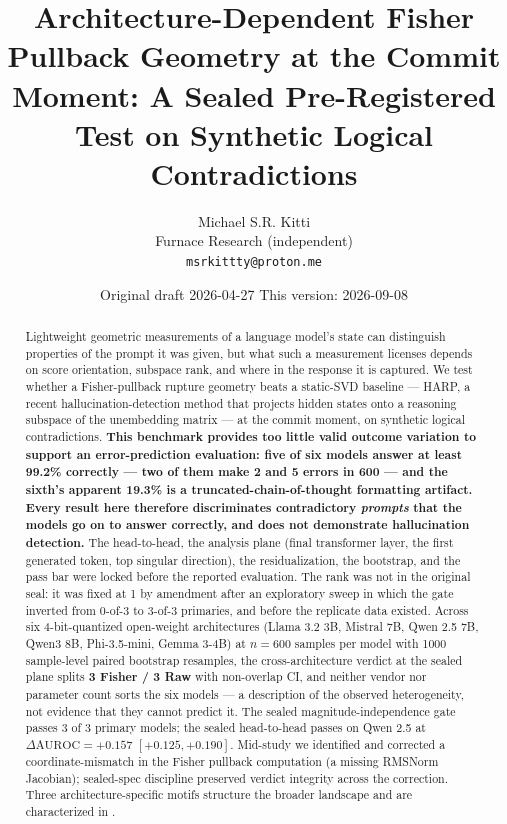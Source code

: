 \documentclass[10pt, letterpaper]{article}
\title{Architecture-Dependent Fisher Pullback Geometry at the Commit
Moment: A Sealed Pre-Registered Test on Synthetic Logical
Contradictions}
\author{Michael S.R. Kitti \\ Furnace Research (independent) \\ \texttt{msrkittty@proton.me}}
\date{Original draft 2026-04-27 \quad This version: 2026-09-08}
\newcommand{\auroc}{\text{AUROC}}
\begin{document}
\maketitle

\begin{abstract}
Lightweight geometric measurements of a language model's state can
distinguish properties of the prompt it was given, but what such a
measurement licenses depends on score orientation, subspace rank, and
where in the response it is captured. We test
whether a Fisher-pullback rupture geometry beats a static-SVD baseline
--- HARP, a recent hallucination-detection method that projects hidden
states onto a reasoning subspace of the unembedding matrix
\citep{hu2025harp} --- at the commit moment, on synthetic logical
contradictions. \textbf{This benchmark provides too little valid outcome
variation to support an error-prediction evaluation: five of six models
answer at least 99.2\% correctly --- two of them make 2 and 5 errors in
600 --- and the sixth's apparent 19.3\% is a truncated-chain-of-thought
formatting artifact. Every result here therefore discriminates contradictory
\emph{prompts} that the models go on to answer correctly, and does not
demonstrate hallucination detection.} The head-to-head, the analysis plane (final
transformer layer, the first generated token, top singular direction),
the residualization, the bootstrap, and the pass bar were locked
before the reported evaluation. The rank was not in the original seal:
it was fixed at 1 by amendment after an exploratory sweep in which the
gate inverted from 0-of-3 to 3-of-3 primaries, and before the
replicate data existed. Across six 4-bit-quantized open-weight
architectures (Llama 3.2 3B, Mistral 7B, Qwen 2.5 7B, Qwen3 8B,
Phi-3.5-mini, Gemma 3-4B) at $n=600$ samples per model with 1000
sample-level paired bootstrap resamples, the cross-architecture
verdict at the sealed plane splits \textbf{3 Fisher / 3 Raw} with
non-overlap CI, and neither vendor nor parameter count sorts the six
models --- a description of the observed heterogeneity, not evidence
that they cannot predict it. The
sealed magnitude-independence gate passes 3 of 3 primary models; the
sealed head-to-head passes on Qwen 2.5 at
$\Delta \auroc = +0.157$ $[+0.125, +0.190]$. Mid-study we identified
and corrected a coordinate-mismatch in the Fisher pullback computation
(a missing RMSNorm Jacobian); sealed-spec discipline preserved verdict
integrity across the correction. Three architecture-specific motifs
structure the broader landscape and are characterized in
.
\end{abstract}
\end{document}
